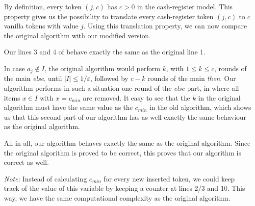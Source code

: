 \documentclass{article}
\renewcommand{\leq}{\leqslant}
\newcounter{rcounter}
\newenvironment{rlist}%
{\begin{list}{\setnr-\arabic{rcounter}}{\usecounter{rcounter}}}{\end{list}}
\begin{document}
\begin{rlist}
        By definition, every token $(j, c)$ has $c>0$ in the cash-register model. This property gives us the possibility to translate every cash-register token $(j,c)$ to $c$ vanilla tokens with value $j$. Using this translation property, we can now compare the original algorithm with our modified version.
        
        Our lines 3 and 4 of behave exactly the same as the original line 1.
        
        In case $a_j \not\in I$, the original algorithm would perform $k$, with $1 \leq k \leq c$, rounds of the main \emph{else}, until $|I| \leq 1/\varepsilon$, followed by $c-k$ rounds of the main \emph{then}. Our algorithm performs in such a situation one round of the \emph{else} part, in where all items $x \in I$ with $x = c_{min}$ are removed. It easy to see that the $k$ in the original algorithm must have the same value as the $c_{min}$ in the old algorithm, which shows us that this second part of our algorithm has as well exactly the same behaviour as the original algorithm.
        
        All in all, our algorithm behaves exactly the same as the original algorithm. Since the original algorithm is proved to be correct, this proves that our algorithm is correct as well. 
        
        \emph{Note:} Instead of calculating $c_{min}$ for every new inserted token, we could keep track of the value of this variable by keeping a counter at lines 2/3 and 10. This way, we have the same computational complexity as the original algorithm.
        
    \end{rlist}
    
    \renewcommand{\setnr}{Str.II}
\end{document}
